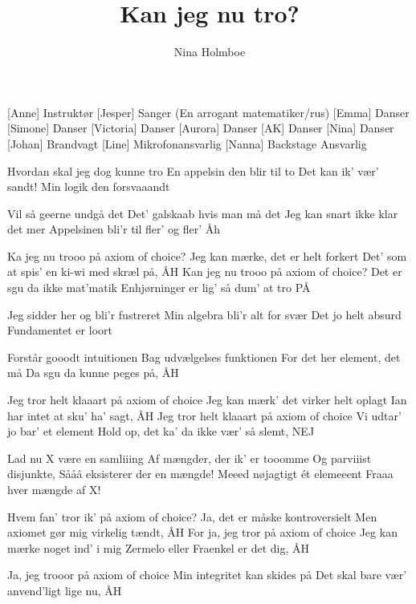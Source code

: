 \documentclass[a4paper,11pt]{article}
\title{Kan jeg nu tro?}
\author{Nina Holmboe}
\begin{document}
\maketitle

\begin{roles}
[Anne] Instruktør
[Jesper] Sanger (En arrogant matematiker/rus)
[Emma] Danser
[Simone] Danser
[Victoria] Danser
[Aurora] Danser
[AK] Danser
[Nina] Danser
[Johan] Brandvagt
[Line] Mikrofonansvarlig
[Nanna] Backstage Ansvarlig
\end{roles}

\begin{song}
 Hvordan skal jeg dog kunne tro 
En appelsin den blir til to 
Det kan ik’ vær’ sandt! 
Min logik den forsvaaandt


 Vil så geerne undgå det
Det’ galskaab hvis man må det
Jeg kan snart ikke klar det mer
Appelsinen bli’r til fler’ og fler’ Åh


 Ka jeg nu trooo på axiom of choice?
Jeg kan mærke, det er helt forkert
Det' som at spis' en ki-wi med skræl på, ÅH
Kan jeg nu trooo på axiom of choice?
Det er sgu da ikke mat'matik
Enhjørninger er lig' så dum' at tro PÅ

 Jeg sidder her og bli’r fustreret
Min algebra bli’r alt for svær
Det jo helt absurd
Fundamentet er loort


 Forstår gooodt intuitionen 
Bag udvælgelses funktionen
For det her element, det må 
Da sgu da kunne peges på, ÅH


 Jeg tror helt klaaart på axiom of choice
Jeg kan mærk' det virker helt oplagt
Ian har intet at sku' ha' sagt, ÅH
Jeg tror helt klaaart på axiom of choice
Vi udtar' jo bar' et element
Hold op, det ka' da ikke vær' så slemt, NEJ

 Lad nu X være en samliiing
Af mængder, der ik' er tooomme
Og parviiist disjunkte,
Sååå eksisterer der en mængde!
Meeed nøjagtigt ét elemeeent
Fraaa hver mængde af X!

 Hvem fan' tror ik' på axiom of choice?
Ja, det er måske kontroversielt
Men axiomet gør mig virkelig tændt, ÅH
For ja, jeg tror på axiom of choice
Jeg kan mærke noget ind' i mig
Zermelo eller Fraenkel er det dig, ÅH

 Ja, jeg trooor på axiom of choice
Min integritet kan skides på
Det skal bare vær' anvend'ligt lige nu, ÅH
\end{song}
\end{document}
